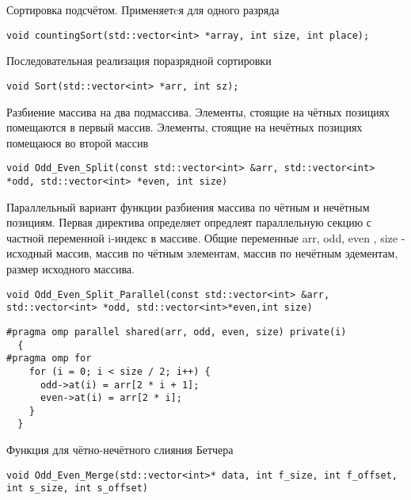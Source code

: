 \documentclass{report}
\begin{document}
\par Сортировка подсчётом. Применяетcя для одного разряда \par
\begin{lstlisting}
void countingSort(std::vector<int> *array, int size, int place);
\end{lstlisting}
\par Последовательная реализация поразрядной сортировки \par
\begin{lstlisting}
void Sort(std::vector<int> *arr, int sz);
\end{lstlisting}
\par Разбиение массива на два подмассива. Элементы, стоящие на чётных позициях помещаются в первый массив. Элементы, стоящие на нечётных позициях помещаюся во второй массив
\par
\begin{lstlisting}
void Odd_Even_Split(const std::vector<int> &arr, std::vector<int> *odd, std::vector<int> *even, int size)
\end{lstlisting}

\par Параллельный вариант функции разбиения массива по чётным и нечётным позициям. Первая директива определяет опредлеят параллельную секцию с частной переменной i-индекс в массиве. Общие переменные arr, odd, even , size - исходный массив, массив по чётным элементам, массив по нечётным эдементам, размер исходного массива.

\begin{lstlisting}
void Odd_Even_Split_Parallel(const std::vector<int> &arr, std::vector<int> *odd, std::vector<int>*even,int size)
\end{lstlisting}

\begin{lstlisting}
#pragma omp parallel shared(arr, odd, even, size) private(i)
  {
#pragma omp for
    for (i = 0; i < size / 2; i++) {
      odd->at(i) = arr[2 * i + 1];
      even->at(i) = arr[2 * i];
    }
  }
\end{lstlisting}
\par

\par Функция для чётно-нечётного слияния Бетчера \par
\begin{lstlisting}
void Odd_Even_Merge(std::vector<int>* data, int f_size, int f_offset, int s_size, int s_offset)
\end{lstlisting}
\end{document}
